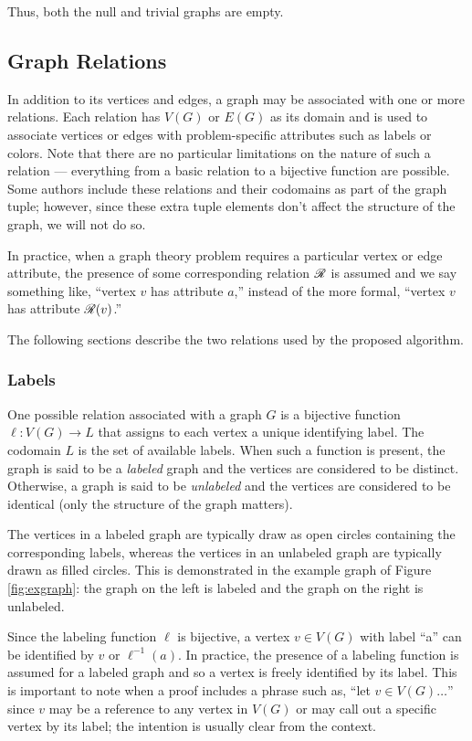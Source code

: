 Thus, both the null and trivial graphs are empty.

\subsection{Graph Relations}

In addition to its vertices and edges, a graph may be associated with one or more relations.  Each relation has
\(V(G)\) or \(E(G)\) as its domain and is used to associate vertices or edges with problem-specific attributes such
as labels or colors.  Note that there are no particular limitations on the nature of such a relation --- everything
from a basic relation to a bijective function are possible.  Some authors include these relations and their
codomains as part of the graph tuple; however, since these extra tuple elements don't affect the structure of the
graph, we will not do so.

In practice, when a graph theory problem requires a particular vertex or edge attribute, the presence of some
corresponding relation \(\mathscr{R}\) is assumed and we say something like, ``vertex \(v\) has attribute \(a\),'' instead
of the more formal, ``vertex \(v\) has attribute \(\mathscr{R}(v)\).''

The following sections describe the two relations used by the proposed algorithm.

\subsubsection{Labels}

One possible relation associated with a graph \(G\) is a bijective function \(\ell:V(G)\to L\) that assigns to each
vertex a unique identifying label.  The codomain \(L\) is the set of available labels.  When such a function is
present, the graph is said to be a \emph{labeled} graph and the vertices are considered to be distinct.  Otherwise,
a graph is said to be \emph{unlabeled} and the vertices are considered to be identical (only the structure of the
graph matters).

The vertices in a labeled graph are typically draw as open circles containing the corresponding labels, whereas the
vertices in an unlabeled graph are typically drawn as filled circles.  This is demonstrated in the example graph of
Figure \ref{fig:exgraph}: the graph on the left is labeled and the graph on the right is unlabeled.

Since the labeling function \(\ell\) is bijective, a vertex \(v\in V(G)\) with label ``a'' can be identified by
\(v\) or \(\ell^{-1}(a)\).  In practice, the presence of a labeling function is assumed for a labeled graph and so
a vertex is freely identified by its label.  This is important to note when a proof includes a phrase such as,
``let \(v\in V(G)\ldots\)'' since \(v\) may be a reference to any vertex in \(V(G)\) or may call out a specific
vertex by its label; the intention is usually clear from the context.

